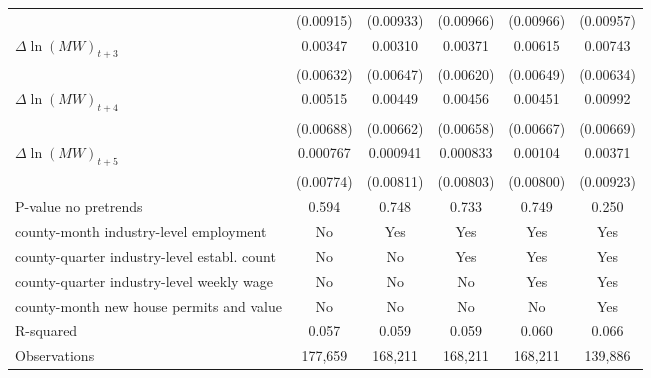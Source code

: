 {\begin{tabular}{l*{5}{c}}
          &(0.00915)         &(0.00933)         &(0.00966)         &(0.00966)         &(0.00957)         \\
[1em]
$\Delta \ln(MW)_{t+3}$&  0.00347         &  0.00310         &  0.00371         &  0.00615         &  0.00743         \\
          &(0.00632)         &(0.00647)         &(0.00620)         &(0.00649)         &(0.00634)         \\
[1em]
$\Delta \ln(MW)_{t+4}$&  0.00515         &  0.00449         &  0.00456         &  0.00451         &  0.00992         \\
          &(0.00688)         &(0.00662)         &(0.00658)         &(0.00667)         &(0.00669)         \\
[1em]
$\Delta \ln(MW)_{t+5}$& 0.000767         & 0.000941         & 0.000833         &  0.00104         &  0.00371         \\
          &(0.00774)         &(0.00811)         &(0.00803)         &(0.00800)         &(0.00923)         \\
\hline
P-value no pretrends&    0.594         &    0.748         &    0.733         &    0.749         &    0.250         \\
county-month industry-level employment&       No         &      Yes         &      Yes         &      Yes         &      Yes         \\
county-quarter industry-level establ. count&       No         &       No         &      Yes         &      Yes         &      Yes         \\
county-quarter industry-level weekly wage&       No         &       No         &       No         &      Yes         &      Yes         \\
county-month new house permits and value&       No         &       No         &       No         &       No         &      Yes         \\
R-squared &    0.057         &    0.059         &    0.059         &    0.060         &    0.066         \\
Observations&  177,659         &  168,211         &  168,211         &  168,211         &  139,886         \\
\hline\hline
\end{tabular}
}
